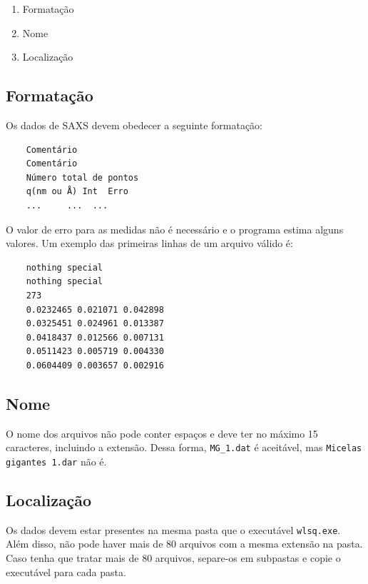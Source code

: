 \begin{apendicesenv}
\begin{enumerate}
	\item Formatação
	\item Nome
	\item Localização
\end{enumerate}

\subsection{Formatação}

Os dados de SAXS devem obedecer a seguinte formatação:

\begin{linenumbers}
	\begin{verbatim}
	Comentário
	Comentário
	Número total de pontos
	q(nm ou Å) Int  Erro
	...     ...  ...
	\end{verbatim}
\end{linenumbers}
\resetlinenumber[1]

O valor de erro para as medidas não é necessário e o programa estima alguns valores. Um exemplo das primeiras linhas de um arquivo válido é:

\begin{linenumbers}
	\begin{verbatim}
	nothing special
	nothing special
	273
	0.0232465 0.021071 0.042898
	0.0325451 0.024961 0.013387
	0.0418437 0.012566 0.007131
	0.0511423 0.005719 0.004330
	0.0604409 0.003657 0.002916
	\end{verbatim}
\end{linenumbers}
\resetlinenumber[1]

\subsection{Nome}

O nome dos arquivos não pode conter espaços e deve ter no máximo 15 caracteres, incluindo a extensão. Dessa forma, \texttt{MG\_1.dat} é aceitável, mas \texttt{Micelas gigantes 1.dar} não é.

\subsection{Localização}
Os dados devem estar presentes na mesma pasta que o executável \texttt{wlsq.exe}. Além disso, não pode haver mais de 80 arquivos com a mesma extensão na pasta. Caso tenha que tratar mais de 80 arquivos, separe-os em subpastas e copie o executável para cada pasta.


\end{apendicesenv}
